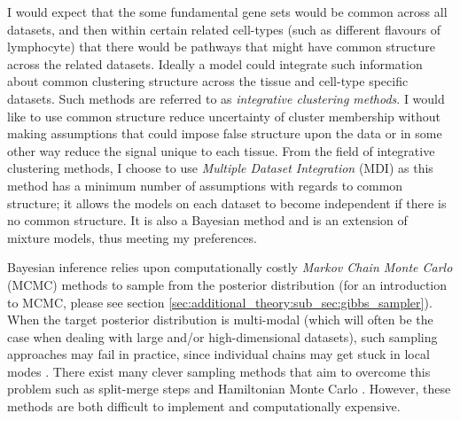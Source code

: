 \documentclass[12pt]{article} %
\begin{document}
	I would expect that the some fundamental gene sets would be common across all datasets, and then within certain related cell-types (such as different flavours of lymphocyte) that there would be pathways that might have common structure across the related datasets. Ideally a model could integrate such information about common clustering structure across the tissue and cell-type specific datasets. Such methods are referred to as \emph{integrative clustering methods}. I would like to use common structure reduce uncertainty of cluster membership without making assumptions that could impose false structure upon the data or in some other way reduce the signal unique to each tissue. From the field of integrative clustering methods, I choose to use \emph{Multiple Dataset Integration} (MDI) \citep{KirkBayesiancorrelatedclustering2012} as this method has a minimum number of assumptions with regards to common structure; it allows the models on each dataset to become independent if there is no common structure. It is also a Bayesian method and is an extension of mixture models, thus meeting my preferences.
	
	Bayesian inference relies upon computationally costly \emph{Markov Chain Monte Carlo} (MCMC) methods to sample from the posterior distribution (for an introduction to MCMC, please see section \ref{sec:additional_theory:sub_sec:gibbs_sampler}). When the target posterior distribution is multi-modal (which will often be the case when dealing with large and/or high-dimensional datasets), such sampling approaches may fail in practice, since individual chains may get stuck in local modes \citep{TjelmelandModeJumpingProposals2001}. There exist many clever sampling methods that aim to overcome this problem such as split-merge steps \citep{dahl_sequentially-allocated_2005} and Hamiltonian Monte Carlo \citep{duane1987hybrid, hoffman2014no}. However, these methods are both difficult to implement and computationally expensive.
	
	
\end{document}
